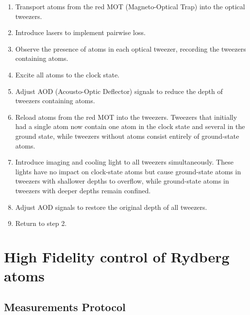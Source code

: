 \documentclass[11pt]{article}
\begin{document}
\begin{enumerate}
    \item Transport atoms from the red MOT (Magneto-Optical Trap) into the optical tweezers.
    \item Introduce lasers to implement pairwise loss.
    \item Observe the presence of atoms in each optical tweezer, recording the tweezers containing atoms.
    \item Excite all atoms to the clock state.
    \item Adjust AOD (Acousto-Optic Deflector) signals to reduce the depth of tweezers containing atoms.
    \item Reload atoms from the red MOT into the tweezers. Tweezers that initially had a single atom now contain one atom in the clock state and several in the ground state, while tweezers without atoms consist entirely of ground-state atoms.
    \item Introduce imaging and cooling light to all tweezers simultaneously. These lights have no impact on clock-state atoms but cause ground-state atoms in tweezers with shallower depths to overflow, while ground-state atoms in tweezers with deeper depths remain confined.
    \item Adjust AOD signals to restore the original depth of all tweezers.
    \item Return to step 2.
\end{enumerate}



\section{High Fidelity control of Rydberg atoms\label{sec:error_atoms}}
\subsection{Measurements Protocol}
\end{document}
